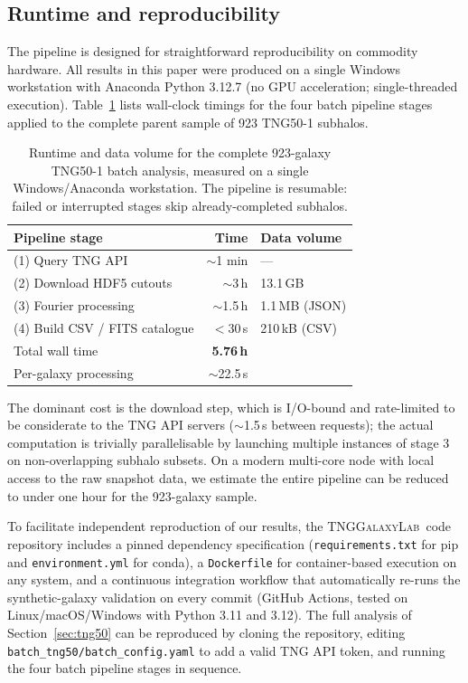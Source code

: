 \documentclass[fleqn,usenatbib]{mnras}
\newcommand{\pipeline}{\textsc{TNGGalaxyLab}}
\begin{document}
\subsection{Runtime and reproducibility}
\label{sec:runtime}

The pipeline is designed for straightforward reproducibility on
commodity hardware.  All results in this paper were produced on a
single Windows workstation with Anaconda Python 3.12.7 (no GPU
acceleration; single-threaded execution).  Table~\ref{tab:runtime}
lists wall-clock timings for the four batch pipeline stages
applied to the complete parent sample of 923 TNG50-1 subhalos.

\begin{table}
  \centering
  \caption{Runtime and data volume for the complete 923-galaxy
    TNG50-1 batch analysis, measured on a single Windows/Anaconda
    workstation.  The pipeline is resumable: failed or interrupted
    stages skip already-completed subhalos.}
  \label{tab:runtime}
  \begin{tabular}{lrl}
    \toprule
    Pipeline stage             & Time    & Data volume \\
    \midrule
    (1) Query TNG API          & $\sim$1 min   & --- \\
    (2) Download HDF5 cutouts  & $\sim$3\,h    & 13.1\,GB \\
    (3) Fourier processing     & $\sim$1.5\,h  & 1.1\,MB (JSON) \\
    (4) Build CSV / FITS catalogue & $<30$\,s  & 210\,kB (CSV) \\
    \midrule
    Total wall time            & \textbf{5.76\,h}  &  \\
    Per-galaxy processing      & $\sim$22.5\,s  & \\
    \bottomrule
  \end{tabular}
\end{table}

The dominant cost is the download step, which is I/O-bound and
rate-limited to be considerate to the TNG API servers ($\sim$1.5\,s
between requests); the actual computation is trivially parallelisable
by launching multiple instances of stage 3 on non-overlapping subhalo
subsets.  On a modern multi-core node with local access to the raw
snapshot data, we estimate the entire pipeline can be reduced to
under one hour for the 923-galaxy sample.

To facilitate independent reproduction of our results, the
\pipeline\ code repository includes a pinned dependency
specification (\texttt{requirements.txt} for pip and
\texttt{environment.yml} for conda), a \texttt{Dockerfile} for
container-based execution on any system, and a continuous
integration workflow that automatically re-runs the synthetic-galaxy
validation on every commit
(GitHub Actions, tested on Linux/macOS/Windows with Python 3.11 and
3.12).  The full analysis of Section~\ref{sec:tng50} can be
reproduced by cloning the repository, editing
\texttt{batch\_tng50/batch\_config.yaml} to add a valid TNG API
token, and running the four batch pipeline stages in sequence.
\end{document}
